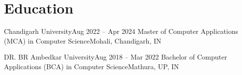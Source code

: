 \section{Education}
    \resumeSubHeadingListStart

    \resumeSubheading
    {Chandigarh University}{Aug 2022 -- Apr 2024}
    {Master of Computer Applications (MCA) in Computer Science}{Mohali, Chandigarh, IN}
    \resumeItemListStart
    \resumeItemListEnd

    \resumeSubheading
    {DR. BR Ambedkar University}{Aug 2018 -- Mar 2022}
    {Bachelor of Computer Applications (BCA) in Computer Science}{Mathura, UP, IN}

    \resumeSubHeadingListEnd
